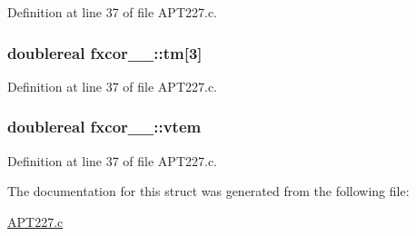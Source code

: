 Definition at line 37 of file A\+P\+T227.\+c.

\subsubsection[{\texorpdfstring{tm}{tm}}]{\setlength{\rightskip}{0pt plus 5cm}doublereal fxcor\+\_\+\_\+\+::tm\mbox{[}3\mbox{]}}\hypertarget{structfxcor__1___a2780d7f3d7830963f9f0d47b85d9a820}{}\label{structfxcor__1___a2780d7f3d7830963f9f0d47b85d9a820}


Definition at line 37 of file A\+P\+T227.\+c.

\subsubsection[{\texorpdfstring{vtem}{vtem}}]{\setlength{\rightskip}{0pt plus 5cm}doublereal fxcor\+\_\+\_\+\+::vtem}\hypertarget{structfxcor__1___a2f6face9ace9e80ff5f8cc99f2bf2343}{}\label{structfxcor__1___a2f6face9ace9e80ff5f8cc99f2bf2343}


Definition at line 37 of file A\+P\+T227.\+c.



The documentation for this struct was generated from the following file\+:\begin{DoxyCompactItemize}
\item 
\hyperlink{APT227_8c}{A\+P\+T227.\+c}\end{DoxyCompactItemize}
